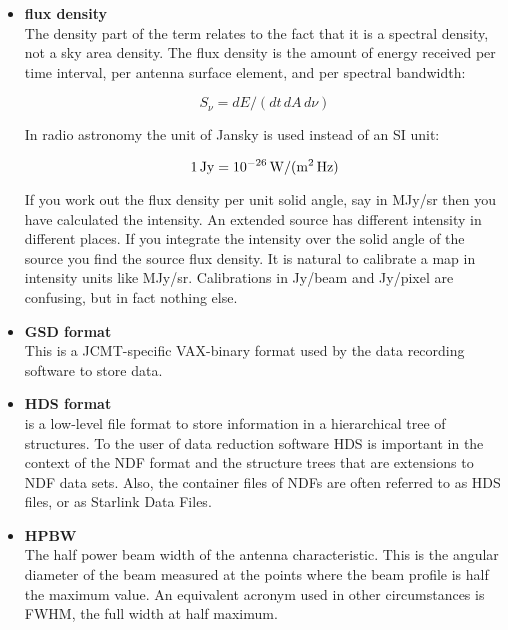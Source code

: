 \begin{itemize}
\item{\bf \label{glossflux}flux density}\\
   The density part of the
   term relates to the fact that it is a spectral density, not a sky
   area density. The flux density is the amount of energy received per
   time interval, per antenna surface element, and per spectral
   bandwidth:

\[S_{\nu} = dE / (dt\, dA\, d\nu)\]

   In radio astronomy the unit of Jansky is used instead of an SI unit:

\[1\,{\rm Jy} = 10^{-26}\,{\rm W / (m^2\, Hz)}\]

   If you work out the flux density per unit solid angle, say in
   MJy/sr then you have calculated the intensity. An extended
   source has different intensity in different places. If you integrate
   the intensity over the solid angle of the source you find the source
   flux density. It is natural to calibrate a map in intensity units
   like MJy/sr. Calibrations in Jy/beam and Jy/pixel are confusing, but
   in fact nothing else.

\item{\bf \label{glossgsd}GSD format}\\
   This is a JCMT-specific VAX-binary
   format used by the data recording software to store data.

\item{\bf \label{glosshds}HDS format}\\
   is a low-level file format to
   store information in a hierarchical tree of structures. To the user
   of data reduction software HDS is important in the context of the NDF
   format and the structure trees that are extensions to NDF data sets.
   Also, the container files of NDFs are often referred to as HDS files,
   or as Starlink Data Files.

\item{\bf \label{glosshpbw}HPBW}\\
   The half power beam width of the antenna
   characteristic. This is the angular diameter of the beam measured at
   the points where the beam profile is half the maximum value. An
   equivalent acronym used in other circumstances is FWHM, the full
   width at half maximum.


\end{itemize}
